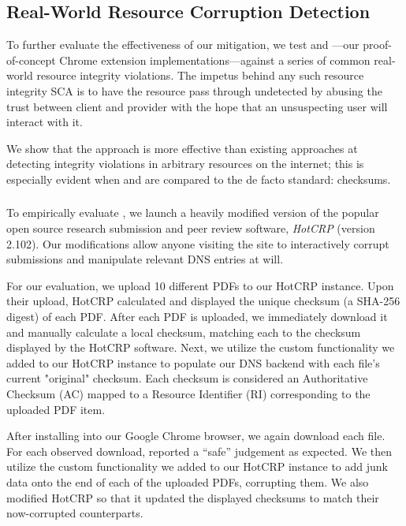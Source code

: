 \subsection{Real-World Resource Corruption Detection}

To further evaluate the effectiveness of our mitigation, we test \DNSSYS{} and
\DHTSYS{}---our proof-of-concept \SYSTEM{} Chrome extension
implementations---against a series of common real-world resource integrity
violations. The impetus behind any such resource integrity SCA is to have the
resource pass through undetected by abusing the trust between client and
provider with the hope that an unsuspecting user will interact with it.

We show that the \SYSTEM{} approach is more effective than existing approaches
at detecting integrity violations in arbitrary resources on the internet; this
is especially evident when \DNSSYS{} and \DHTSYS{} are compared to the de facto
standard: checksums.

\subsubsection{\DNSSYS{}}

To empirically evaluate \DNSSYS{}, we launch a heavily modified version of the
popular open source research submission and peer review software, \emph{HotCRP}
(version 2.102). Our modifications allow anyone visiting the site to
interactively corrupt submissions and manipulate relevant DNS entries at will.

For our evaluation, we upload 10 different \CONFERENCE{} PDFs to our HotCRP
instance. Upon their upload, HotCRP calculated and displayed the unique checksum
(a SHA-256 digest) of each PDF. After each PDF is uploaded, we immediately
download it and manually calculate a local checksum, matching each to the
checksum displayed by the HotCRP software. Next, we utilize the custom
functionality we added to our HotCRP instance to populate our DNS backend with
each file's current "original" checksum. Each checksum is considered an
Authoritative Checksum (AC) mapped to a Resource Identifier (RI) corresponding
to the uploaded PDF item.

After installing \DNSSYS{} into our Google Chrome browser, we again download
each file. For each observed download, \DNSSYS{} reported a ``safe'' judgement
as expected. We then utilize the custom functionality we added to our HotCRP
instance to add junk data onto the end of each of the uploaded PDFs, corrupting
them. We also modified HotCRP so that it updated the displayed checksums to
match their now-corrupted counterparts.

